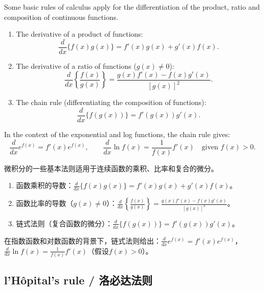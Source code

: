 \begin{original}
Some basic rules of calculus apply for the differentiation of the product, ratio and composition of continuous functions.
\begin{enumerate}
\item The derivative of a product of functions:
\[
\frac{d}{dx}\{f(x)g(x)\} = f'(x)g(x) + g'(x)f(x).
\]
\item The derivative of a ratio of functions ($g(x) \neq 0$):
\[
\frac{d}{dx}\left\{\frac{f(x)}{g(x)}\right\} = \frac{g(x)f'(x) - f(x)g'(x)}{[g(x)]^2}.
\]
\item The chain rule (differentiating the composition of functions):
\[
\frac{d}{dx}\{f(g(x))\} = f'(g(x))g'(x).
\]
\end{enumerate}

In the context of the exponential and log functions, the chain rule gives:
\[
\frac{d}{dx} e^{f(x)} = f'(x) e^{f(x)}, \qquad \frac{d}{dx} \ln f(x) = \frac{1}{f(x)} f'(x) \quad \text{given } f(x) > 0.
\]
\end{original}
\begin{translation}
微积分的一些基本法则适用于连续函数的乘积、比率和复合的微分。
\begin{enumerate}
\item 函数乘积的导数：$\frac{d}{dx}\{f(x)g(x)\} = f'(x)g(x) + g'(x)f(x)$。
\item 函数比率的导数（$g(x) \neq 0$）：$\frac{d}{dx}\left\{\frac{f(x)}{g(x)}\right\} = \frac{g(x)f'(x) - f(x)g'(x)}{[g(x)]^2}$。
\item 链式法则（复合函数的微分）：$\frac{d}{dx}\{f(g(x))\} = f'(g(x))g'(x)$。
\end{enumerate}
在指数函数和对数函数的背景下，链式法则给出：$\frac{d}{dx} e^{f(x)} = f'(x) e^{f(x)}$，$\frac{d}{dx} \ln f(x) = \frac{1}{f(x)} f'(x)$（假设$f(x) > 0$）。
\end{translation}

\subsection{l'H\^{o}pital's rule / 洛必达法则}

